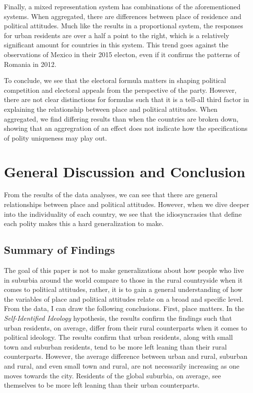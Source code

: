 \documentclass[12pt, titlepage]{article}
\newcommand\e{\emph}
\begin{document}
Finally, a mixed representation system has combinations of the aforementioned systems. When aggregated, there are differences between place of residence and political attitudes. Much like the results in a proportional system, the responses for urban residents are over a half a point to the right, which is a relatively significant amount for countries in this system. This trend goes against the observations of Mexico in their 2015 electon, even if it confirms the patterns of Romania in 2012. 

To conclude, we see that the electoral formula matters in shaping political competition and electoral appeals from the perspective of the party. However, there are not clear distinctions for formulas such that it is a tell-all third factor in explaining the relationship between place and political attitudes. When aggregated, we find differing results than when the countries are broken down, showing that an aggregration of an effect does not indicate how the specifications of polity uniqueness may play out.

\section{General Discussion and Conclusion}

From the results of the data analyses, we can see that there are general relationships between place and political attitudes. However, when we dive deeper into the individuality of each country, we see that the idiosyncrasies that define each polity makes this a hard generalization to make. 

\subsection{Summary of Findings}

The goal of this paper is not to make generalizations about how people who live in suburbia around the world compare to those in the rural countryside when it comes to political attitudes, rather, it is to gain a general understanding of how the variables of place and political attitudes relate on a broad and specific level. From the data, I can draw the following conclusions. First, place matters. In the \e{Self-Identified Ideology} hypothesis, the results confirm the findings such that urban residents, on average, differ from their rural counterparts when it comes to political ideology. The results confirm that urban residents, along with small town and suburban residents, tend to be more left leaning than their rural counterparts. However, the average difference between urban and rural, suburban and rural, and even small town and rural, are not necessarily increasing as one moves towards the city. Residents of the global suburbia, on average, see themselves to be more left leaning than their urban counterparts.
\end{document}
